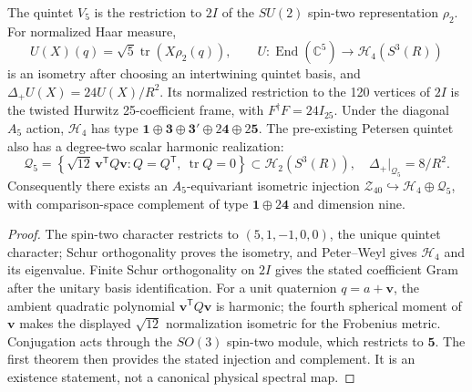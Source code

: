 \documentclass[11pt]{article}
\begin{document}
\begin{theorem}
\label{p1:thm:v349-twisted25-spin2-lift}
The quintet $V_5$ is the restriction to $2I$ of the $SU(2)$
spin-two representation $\rho_2$.  For normalized Haar measure,
\[
 U(X)(q)=\sqrt5\operatorname{tr}(X\rho_2(q)),\qquad
 U:\operatorname{End}(\mathbb C^5)\longrightarrow
 \mathcal H_4(S^3(R))
\]
is an isometry after choosing an intertwining quintet basis, and
$\Delta_+U(X)=24U(X)/R^2$.  Its normalized restriction to the
120 vertices of $2I$ is the twisted Hurwitz 25-coefficient frame,
with $F^\dagger F=24I_{25}$.  Under the diagonal $A_5$ action,
$\mathcal H_4$ has type $\mathbf1\oplus\mathbf3\oplus\mathbf3'
\oplus2\mathbf4\oplus2\mathbf5$.
The pre-existing Petersen quintet also has a degree-two scalar
harmonic realization:
\[
 \mathcal Q_5=\left\{\sqrt{12}\,\mathbf v^{\mathsf T}Q\mathbf v:
 Q=Q^{\mathsf T},\ \operatorname{tr}Q=0\right\}
 \subset\mathcal H_2(S^3(R)),\quad
 \Delta_+|_{\mathcal Q_5}=8/R^2.
\]
Consequently there exists an $A_5$-equivariant isometric injection
$\mathcal Z_{40}\hookrightarrow\mathcal H_4\oplus\mathcal Q_5$,
with comparison-space complement of type $\mathbf1\oplus2\mathbf4$
and dimension nine.
\end{theorem}
\begin{proof}
The spin-two character restricts to $(5,1,-1,0,0)$, the
unique quintet character; Schur orthogonality proves the isometry,
and Peter--Weyl gives $\mathcal H_4$ and its eigenvalue.
Finite Schur orthogonality on $2I$ gives the stated coefficient
Gram after the unitary basis identification.  For a unit
quaternion $q=a+\mathbf v$, the ambient quadratic polynomial
$\mathbf v^{\mathsf T}Q\mathbf v$ is harmonic; the fourth spherical
moment of $\mathbf v$ makes the displayed $\sqrt{12}$
normalization isometric for the Frobenius metric.  Conjugation
acts through the $SO(3)$ spin-two module, which restricts to
$\mathbf5$.  The first theorem then provides the stated
injection and complement.  It is an existence statement, not a
canonical physical spectral map.
\end{proof}
\end{document}
